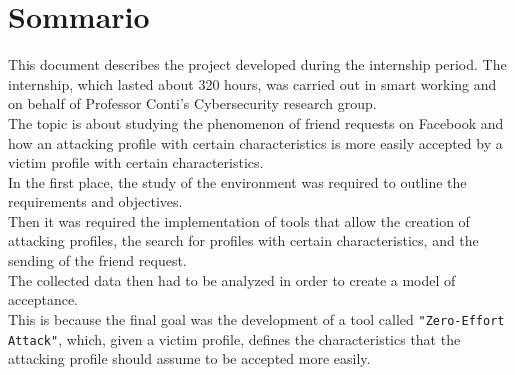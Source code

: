 
\cleardoublepage
{}
{}
\begingroup
\let\clearpage\relax
\let\cleardoublepage\relax
\let\cleardoublepage\relax

\chapter*{Sommario}

This document describes the project developed during the internship period. The internship, which lasted about 320 hours, was carried out in smart working and on behalf of Professor Conti's Cybersecurity research group.\\
The topic is about studying the phenomenon of friend requests on Facebook and how an attacking profile with certain characteristics is more easily accepted by a victim profile with certain characteristics.\\
In the first place, the study of the environment was required to outline the requirements and objectives.\\
Then it was required the implementation of tools that allow the creation of attacking profiles, the search for profiles with certain characteristics, and the sending of the friend request.\\
The collected data then had to be analyzed in order to create a model of acceptance.\\
This is because the final goal was the development of a tool called \texttt{"Zero-Effort Attack"}, which, given a victim profile, defines the characteristics that the attacking profile should assume to be accepted more easily.

%
%

\endgroup			

\vfill

